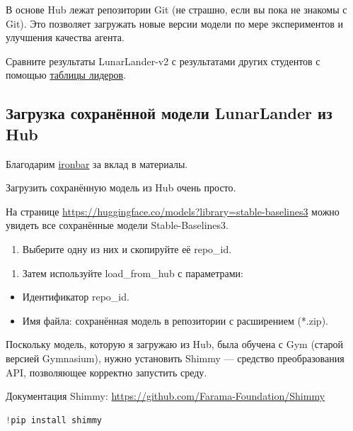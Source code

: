 \documentclass[11pt,a4paper]{article}
\begin{document}
В основе Hub лежат репозитории Git (не страшно, если вы пока не знакомы с Git). Это позволяет загружать новые версии модели по мере экспериментов и улучшения качества агента.

Сравните результаты LunarLander-v2 с результатами других студентов с помощью \href{https://huggingface.co/spaces/huggingface-projects/Deep-Reinforcement-Learning-Leaderboard}{таблицы лидеров}.

\subsection{Загрузка сохранённой модели LunarLander из Hub}\label{load-a-saved-lunarlander-model-from-the-hub}

Благодарим \href{https://github.com/ironbar}{ironbar} за вклад в материалы.

Загрузить сохранённую модель из Hub очень просто.

На странице \url{https://huggingface.co/models?library=stable-baselines3} можно увидеть все сохранённые модели Stable-Baselines3.

\begin{enumerate}
\def\labelenumi{\arabic{enumi}.}
\tightlist
\item
  Выберите одну из них и скопируйте её repo\_id.
\end{enumerate}


\begin{enumerate}
\def\labelenumi{\arabic{enumi}.}
\setcounter{enumi}{1}
\tightlist
\item
  Затем используйте load\_from\_hub с параметрами:
\end{enumerate}

\begin{itemize}
\tightlist
\item
  Идентификатор repo\_id.
\item
  Имя файла: сохранённая модель в репозитории с расширением (*.zip).
\end{itemize}

Поскольку модель, которую я загружаю из Hub, была обучена с Gym (старой версией Gymnasium), нужно установить Shimmy --- средство преобразования API, позволяющее корректно запустить среду.

Документация Shimmy: \url{https://github.com/Farama-Foundation/Shimmy}

\begin{lstlisting}[language=Python]
!pip install shimmy
\end{lstlisting}
\end{document}
